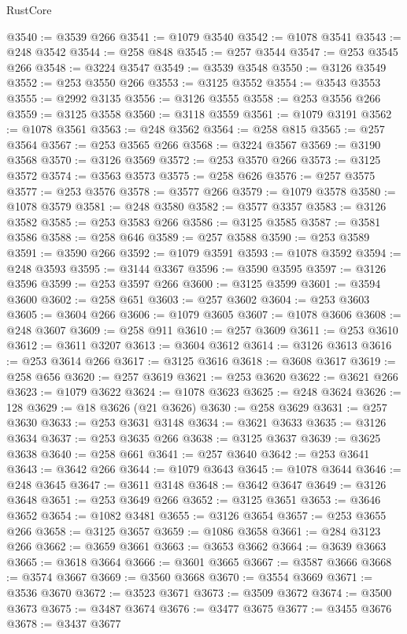 \begin{lexlean}{RustCore}
\begin{coremodule}
@3540 := @3539 @266
@3541 := @1079 @3540
@3542 := @1078 @3541
@3543 := @248 @3542
@3544 := @258 @848
@3545 := @257 @3544
@3547 := @253 @3545 @266
@3548 := @3224 @3547
@3549 := @3539 @3548
@3550 := @3126 @3549
@3552 := @253 @3550 @266
@3553 := @3125 @3552
@3554 := @3543 @3553
@3555 := @2992 @3135
@3556 := @3126 @3555
@3558 := @253 @3556 @266
@3559 := @3125 @3558
@3560 := @3118 @3559
@3561 := @1079 @3191
@3562 := @1078 @3561
@3563 := @248 @3562
@3564 := @258 @815
@3565 := @257 @3564
@3567 := @253 @3565 @266
@3568 := @3224 @3567
@3569 := @3190 @3568
@3570 := @3126 @3569
@3572 := @253 @3570 @266
@3573 := @3125 @3572
@3574 := @3563 @3573
@3575 := @258 @626
@3576 := @257 @3575
@3577 := @253 @3576
@3578 := @3577 @266
@3579 := @1079 @3578
@3580 := @1078 @3579
@3581 := @248 @3580
@3582 := @3577 @3357
@3583 := @3126 @3582
@3585 := @253 @3583 @266
@3586 := @3125 @3585
@3587 := @3581 @3586
@3588 := @258 @646
@3589 := @257 @3588
@3590 := @253 @3589
@3591 := @3590 @266
@3592 := @1079 @3591
@3593 := @1078 @3592
@3594 := @248 @3593
@3595 := @3144 @3367
@3596 := @3590 @3595
@3597 := @3126 @3596
@3599 := @253 @3597 @266
@3600 := @3125 @3599
@3601 := @3594 @3600
@3602 := @258 @651
@3603 := @257 @3602
@3604 := @253 @3603
@3605 := @3604 @266
@3606 := @1079 @3605
@3607 := @1078 @3606
@3608 := @248 @3607
@3609 := @258 @911
@3610 := @257 @3609
@3611 := @253 @3610
@3612 := @3611 @3207
@3613 := @3604 @3612
@3614 := @3126 @3613
@3616 := @253 @3614 @266
@3617 := @3125 @3616
@3618 := @3608 @3617
@3619 := @258 @656
@3620 := @257 @3619
@3621 := @253 @3620
@3622 := @3621 @266
@3623 := @1079 @3622
@3624 := @1078 @3623
@3625 := @248 @3624
@3626 := 128
@3629 := @18 @3626 (@21 @3626)
@3630 := @258 @3629
@3631 := @257 @3630
@3633 := @253 @3631 @3148
@3634 := @3621 @3633
@3635 := @3126 @3634
@3637 := @253 @3635 @266
@3638 := @3125 @3637
@3639 := @3625 @3638
@3640 := @258 @661
@3641 := @257 @3640
@3642 := @253 @3641
@3643 := @3642 @266
@3644 := @1079 @3643
@3645 := @1078 @3644
@3646 := @248 @3645
@3647 := @3611 @3148
@3648 := @3642 @3647
@3649 := @3126 @3648
@3651 := @253 @3649 @266
@3652 := @3125 @3651
@3653 := @3646 @3652
@3654 := @1082 @3481
@3655 := @3126 @3654
@3657 := @253 @3655 @266
@3658 := @3125 @3657
@3659 := @1086 @3658
@3661 := @284 @3123 @266
@3662 := @3659 @3661
@3663 := @3653 @3662
@3664 := @3639 @3663
@3665 := @3618 @3664
@3666 := @3601 @3665
@3667 := @3587 @3666
@3668 := @3574 @3667
@3669 := @3560 @3668
@3670 := @3554 @3669
@3671 := @3536 @3670
@3672 := @3523 @3671
@3673 := @3509 @3672
@3674 := @3500 @3673
@3675 := @3487 @3674
@3676 := @3477 @3675
@3677 := @3455 @3676
@3678 := @3437 @3677

\end{coremodule}
\end{lexlean}
